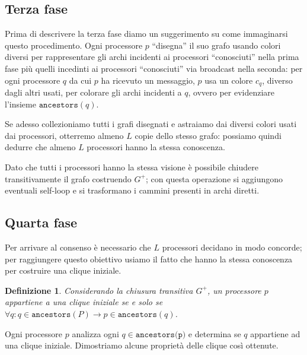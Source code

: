 \documentclass{article}
\newtheorem{definizione}{Definizione}
\begin{document}
\subsection{Terza fase}
Prima di descrivere la terza fase diamo un suggerimento su come
immaginarsi questo procedimento. Ogni processore $p$ ``disegna'' il
suo grafo usando colori diversi per rappresentare gli archi incidenti
ai processori ``conosciuti'' nella prima fase più quelli incedinti ai
processori ``conosciuti'' via broadcast nella seconda: per ogni
processore $q$ da cui $p$ ha ricevuto un messaggio, $p$ usa un colore
$c_q$, diverso dagli altri usati, per colorare gli archi incidenti a
$q$, ovvero per evidenziare l'insieme $\texttt{ancestors}(q)$.

Se adesso collezioniamo tutti i grafi disegnati e astraiamo dai
diversi colori usati dai processori, otterremo almeno $L$ copie dello
stesso grafo: possiamo quindi dedurre che almeno $L$ processori hanno
la stessa conoscenza.

Dato che tutti i processori hanno la stessa visione è possibile
chiudere transitivamente il grafo costruendo $G^+$; con questa
operazione si aggiungono eventuali self-loop e si trasformano i
cammini presenti in archi diretti.

\subsection{Quarta fase}
Per arrivare al consenso è necessario che $L$ processori decidano in
modo concorde; per raggiungere questo obiettivo usiamo il fatto che
hanno la stessa conoscenza per costruire una clique iniziale.
\begin{definizione}
  Considerando la chiusura transitiva $G^+$, un processore $p$
  appartiene a una clique iniziale se e solo se $\forall q:
  q\in\texttt{ancestors}(P)\rightarrow p\in\texttt{ancestors}(q)$.
\end{definizione} 
Ogni processore $p$ analizza ogni $q \in \texttt{ancestors(p)}$ e
determina se $q$ appartiene ad una clique iniziale. Dimostriamo alcune
proprietà delle clique così ottenute.
\end{document}
